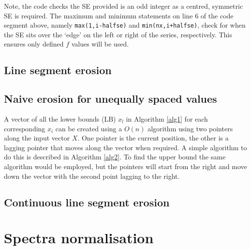 \documentclass[12pt,a4paper,oneside]{report}
\begin{document}
\begin{appendix}
\vskip12pt


Note, the code checks the SE provided is an odd integer as a centred, symmetric SE is required. The maximum and minimum statements on line 6 of the code segment above, namely {\tt max(1,i-halfse)} and {\tt min(nx,i+halfse)}, check for when the SE sits over the `edge' on the left or right of the series, respectively. This ensures only defined $f$ values will be used. 
	
\clearpage	
	
\subsection{Line segment erosion} 


	

\clearpage
		
\subsection{Naive erosion for unequally spaced values}


A vector of all the lower bounds (LB) $x_l$ in Algorithm \ref{alg1} for each corresponding $x_i$ can be created using a $O (n)$ algorithm using two pointers along the input vector $X$. One pointer is the current position, the other is a lagging pointer that moves along the vector when required. A simple algorithm to do this is described in Algorithm \ref{alg2}. To find the upper bound the same algorithm would be employed, but the pointers will start from the right and move down the vector with the second point lagging to the right.\\[15pt]


	


	\clearpage



\subsection{Continuous line segment erosion} 


	






\clearpage


\section{Spectra normalisation}


\end{appendix}
\end{document}
